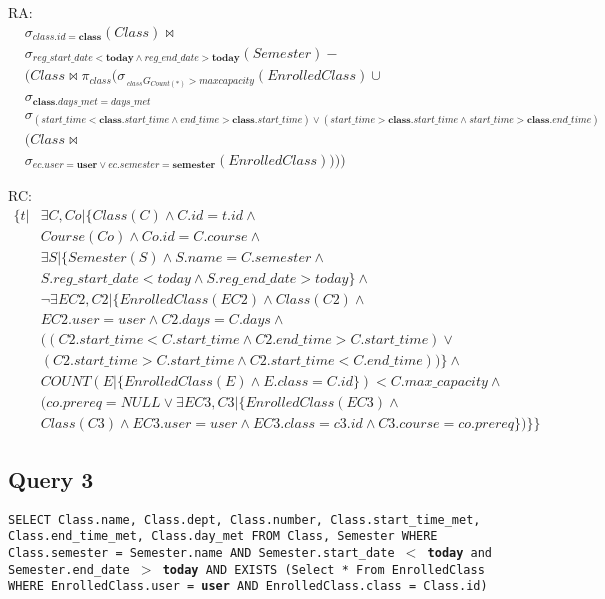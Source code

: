 \documentclass[11pt,oneside,a4paper]{article}
\begin{document}
RA:
\begin{align*} 
&\sigma_{class.id=\textbf{class}}(Class) \bowtie \\
& \sigma_{reg\_start\_date  < \textbf{today} \wedge reg\_end\_date >
\textbf{today}}(Semester) - \\
&(Class \bowtie \pi_{class}(\sigma_{\,_{class}G_{Count(*)} >
maxcapacity}(EnrolledClass) \cup \\
&\sigma_{\textbf{class}.days\_met = days\_met} \\
&\sigma_{ 
(start\_time < \textbf{class}.start\_time \wedge end\_time >
\textbf{class}.start\_time)
\vee (start\_time > \textbf{class}.start\_time 
\wedge start\_time > \textbf{class}.end\_time)} \\
&(Class \bowtie \\
&\sigma_{ec.user = \textbf{user}\vee 
ec.semester=\textbf{semester}}(EnrolledClass)))) 
\end{align*}

RC:
\begin{align*} \{ t | & \exists C, Co | \{Class(C) \wedge C.id = t.id
  \wedge \\
 &  Course(Co)  \wedge Co.id = C.course \wedge \\
 &  \exists S | \{Semester(S) \wedge S.name = C.semester \wedge \\
&   S.reg\_start\_date < today \wedge S.reg\_end\_date > today\} \wedge \\
 &  \neg \exists EC2, C2 | \{EnrolledClass(EC2) \wedge Class(C2) \wedge\\
&   EC2.user = user \wedge C2.days = C.days \wedge \\
&   ((C2.start\_time < C.start\_time \wedge C2.end\_time > C.start\_time ) \vee \\
&  (C2.start\_time > C.start\_time \wedge C2.start\_time < C.end\_time))\} \wedge
  \\
&   COUNT(E | \{EnrolledClass(E) \wedge E.class = C.id \}) < C.max\_capacity \wedge \\
&  (co.prereq = NULL \vee \exists EC3, C3 | \{EnrolledClass(EC3) \wedge \\
&   Class(C3)
  \wedge EC3.user = user \wedge EC3.class = c3.id \wedge C3.course =
  co.prereq\})\}\}
\end{align*}

\subsection{Query 3}
\texttt{SELECT Class.name, Class.dept, Class.number, Class.start\_time\_met,
Class.end\_time\_met, Class.day\_met FROM Class, Semester WHERE Class.semester
= Semester.name AND Semester.start\_date $<$ \textbf{today} and
Semester.end\_date $>$ \textbf{today} AND EXISTS (Select * From EnrolledClass
WHERE EnrolledClass.user = \textbf{user} AND EnrolledClass.class = Class.id)}
\end{document}
